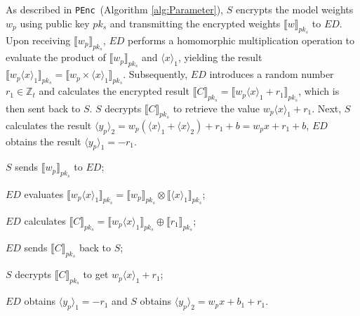 \documentclass[conference]{IEEEtran}
\newcommand{\PEnc}{\texttt{PEnc}}
\begin{document}
As described in \PEnc~(Algorithm \ref{alg:Parameter}), $S$ encrypts the model weights $w_p$ using public key $pk_s$ and transmitting the encrypted weights $\llbracket w \rrbracket_{pk_s}$ to $ED$. Upon receiving $\llbracket w_p \rrbracket_{pk_s}$, $ED$ performs a homomorphic multiplication operation to evaluate the product of $\llbracket w_p \rrbracket_{pk_s}$ and $\langle x \rangle_1$, yielding the result $\llbracket w_p \langle x \rangle_1\rrbracket_{pk_s} = \llbracket w_p \times \langle x \rangle_1 \rrbracket_{pk_s}$. Subsequently, $ED$ introduces a random number $r_1\in \mathbb{Z}_t$ and calculates the encrypted result $\llbracket C \rrbracket_{pk_s}=\llbracket w_p \langle x \rangle_1 + r_1 \rrbracket_{pk_s}$, which is then sent back to $S$. $S$ decrypts $\llbracket C \rrbracket_{pk_s}$ to retrieve the value $w_p\langle x \rangle_1+r_1$. Next, $S$ calculates the result $\langle y_p\rangle_2= w_p(\langle x \rangle_1 + \langle x \rangle_2)+r_1+b=w_px+r_1+b$, $ED$ obtains the result $\langle y_p\rangle_1=-r_1$. 
\begin{algorithm}[htbp]
	\caption{\PEnc($\langle x \rangle_1,\langle x \rangle_2,w,b) \rightarrow (\langle y_p\rangle_1, \langle y_p\rangle_2$)}
    \label{alg:Parameter}
    \LinesNumbered
     $S$ sends $\llbracket w_p\rrbracket_{pk_s}$ to $ED$;
    
     $ED$ evaluates $\llbracket w_p\langle x \rangle_1 \rrbracket_{pk_s} = \llbracket w_p \rrbracket_{pk_s} \otimes \llbracket \langle x \rangle_1 \rrbracket_{pk_s}$;
    
     $ED$  calculates $\llbracket C\rrbracket_{pk_s} = \llbracket w_p\langle x \rangle_1 \rrbracket_{pk_s} \oplus \llbracket r_1 \rrbracket_{pk_s}$;
     
     $ED$ sends $\llbracket C\rrbracket_{pk_s}$ back to $S$;
    
     $S$ decrypts $\llbracket C\rrbracket_{pk_s}$ to get $w_p\langle x \rangle_1 + r_1$;
     
     $ED$ obtains $\langle y_p\rangle_1=-r_1$ and $S$ obtains $\langle y_p\rangle_2 = w_p x  + b_1 + r_1$.
\end{algorithm}
\end{document}
